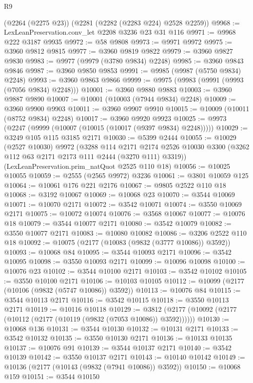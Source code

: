 \begin{lexlean}{R9}
\begin{coremodule}
    (@2264 (@2275 @23))
    (@2281 (@2282 (@2283 @224) @2528 @2259))
@9968 := LexLeanPreservation.conv_let @2208 @3236 @23 @31 @116
@9971 := @9968 @222 @3187 @9935
@9972 := @58 @9808
@9973 := @9971 @9972
@9975 := @3960 @9812 @9815
@9977 := @3960 @9819 @9822
@9979 := @3960 @9827 @9830
@9983 := @9977 (@9979 (@3780 @9834) @2248)
@9985 := @3960 @9843 @9846
@9987 := @3960 @9850 @9853
@9991 := @9985 (@9987 (@5750 @9834) @2248)
@9993 := @3960 @9863 @9866
@9999 := @9975 (@9983 (@9991 (@9993 (@7056 @9834) @2248)))
@10001 := @3960 @9880 @9883
@10003 := @3960 @9887 @9890
@10007 := @10001 (@10003 (@7944 @9834) @2248)
@10009 := @3960 @9900 @9903
@10011 := @3960 @9907 @9910
@10015 := @10009 (@10011 (@8752 @9834) @2248)
@10017 := @3960 @9920 @9923
@10025 := @9973 (@2247 (@9999 (@10007 (@10015 (@10017 (@9397 @9834) @2248)))))
@10029 := @3249 @105 @115 @3185 @2171
@10030 := @5399 @2444
@10055 := @10029
    (@2527 @10030)
    @9972
    (@3288
      @114
      @2171
      @2174
      @2526
      @10030
      @3300
      (@3262 @112 @63 @2171 @2173 @111 @2444 (@3270 @111) @3319))
    (LexLeanPreservation.prim_natQuot @2525 @110 @18)
@10056 := @10025 @10055
@10059 := @2555 (@2565 @9972) @3236
@10061 := @3801 @10059 @125
@10064 := @10061 @176 @221 @2176
@10067 := @9805 @2522 @110 @18
@10068 := @3192 @10067
@10069 := @10068 @23
@10070 := @3544 @10069
@10071 := @10070 @2171
@10072 := @3542 @10071
@10074 := @3550 @10069 @2171
@10075 := @10072 @10074
@10076 := @3568 @10067
@10077 := @10076 @18
@10079 := @3544 @10077 @2171
@10080 := @3542 @10079
@10082 := @3550 @10077 @2171
@10083 := @10080 @10082
@10086 := @3206 @2522 @110 @18
@10092 := @10075 (@2177 (@10083 (@9832 (@3777 @10086)) @3592))
@10093 := @10068 @84
@10095 := @3544 @10093 @2171
@10096 := @3542 @10095
@10098 := @3550 @10093 @2171
@10099 := @10096 @10098
@10100 := @10076 @23
@10102 := @3544 @10100 @2171
@10103 := @3542 @10102
@10105 := @3550 @10100 @2171
@10106 := @10103 @10105
@10112 := @10099 (@2177 (@10106 (@9832 (@5747 @10086)) @3592))
@10113 := @10076 @84
@10115 := @3544 @10113 @2171
@10116 := @3542 @10115
@10118 := @3550 @10113 @2171
@10119 := @10116 @10118
@10129 := @3812 (@2177 (@10092 (@2177 (@10112 (@2177 (@10119 (@9832 (@7053 @10086)) @3592))))))
@10130 := @10068 @136
@10131 := @3544 @10130
@10132 := @10131 @2171
@10133 := @3542 @10132
@10135 := @3550 @10130 @2171
@10136 := @10133 @10135
@10137 := @10076 @91
@10139 := @3544 @10137 @2171
@10140 := @3542 @10139
@10142 := @3550 @10137 @2171
@10143 := @10140 @10142
@10149 := @10136 (@2177 (@10143 (@9832 (@7941 @10086)) @3592))
@10150 := @10068 @159
@10151 := @3544 @10150

\end{coremodule}
\end{lexlean}

